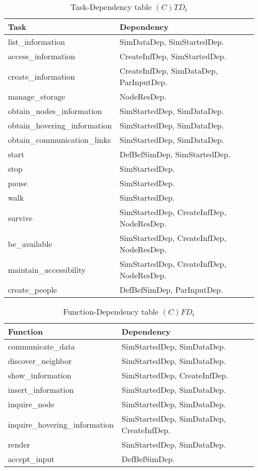 \begin{table}[H]
	\centering
	\begin{tabular}{|p{5cm}|p{7cm}|}
			\hline
			\textbf{Task} & \textbf{Dependency} \\
			\hline
			list\_information & SimDataDep, SimStartedDep.\\
			\hline
			access\_information & CreateInfDep, SimStartedDep.\\
			\hline
			create\_information & CreateInfDep, SimDataDep, ParInputDep. \\
			\hline
			manage\_storage & NodeResDep. \\
			\hline
			obtain\_nodes\_information & SimStartedDep, SimDataDep.\\
			\hline
			obtain\_hovering\_information & SimStartedDep, SimDataDep. \\
			\hline
			obtain\_communication\_links & SimStartedDep, SimDataDep. \\
			\hline
			start & DefBefSimDep, SimStartedDep. \\
			\hline
			stop & SimStartedDep. \\
			\hline
			pause &SimStartedDep. \\
			\hline
			walk & SimStartedDep. \\
			\hline
			survive & SimStartedDep, CreateInfDep, NodeResDep. \\
			\hline
			be\_available & SimStartedDep, CreateInfDep, NodeResDep. \\
			\hline
			maintain\_accessibility & SimStartedDep, CreateInfDep, NodeResDep. \\
			\hline
			create\_people & DefBefSimDep, ParInputDep. \\
			\hline
		\end{tabular}
	\caption{Task-Dependency table $(C)TD_t$}
	\label{tab:ctdt}
\end{table}

\begin{table}[H]
	\centering
	\begin{tabular}{|p{5cm}|p{7cm}|}
			\hline
			\textbf{Function} & \textbf{Dependency} \\
			\hline
			communicate\_data & SimStartedDep, SimDataDep.\\
			\hline
			discover\_neighbor & SimStartedDep, SimDataDep.\\
			\hline
			show\_information & SimStartedDep, CreateInfDep.\\
			\hline
			insert\_information & SimStartedDep, SimDataDep.\\
			\hline
			inquire\_node & SimStartedDep, SimDataDep.\\
			\hline
			inquire\_hovering\_information & SimStartedDep, SimDataDep, CreateInfDep.\\
			\hline
			render & SimStartedDep, SimDataDep. \\
			\hline
			accept\_input & DefBefSimDep. \\
			\hline
		\end{tabular}
	\caption{Function-Dependency table $(C)FD_t$}
	\label{tab:cfdt}
\end{table}

